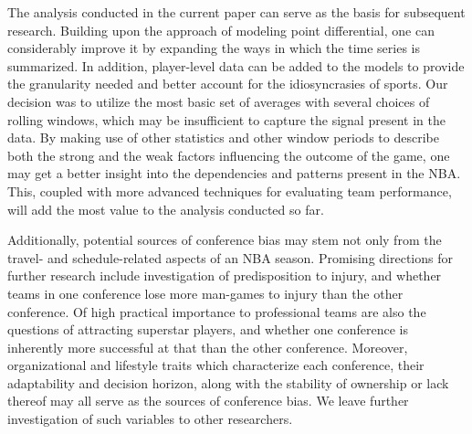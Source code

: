 \documentclass[
    12pt,
    a4paper,
    titlepage,  %
    abstract,  %
    headings=standardclasses,  %
    bibliography=totocnumbered  %
]{scrartcl}
\begin{document}
The analysis conducted in the current paper can serve as the basis for subsequent research. Building upon the approach of modeling point differential, one can considerably improve it by expanding the ways in which the time series is summarized. In addition, player-level data can be added to the models to provide the granularity needed and better account for the idiosyncrasies of sports. Our decision was to utilize the most basic set of averages with several choices of rolling windows, which may be insufficient to capture the signal present in the data. By making use of other statistics and other window periods to describe both the strong and the weak factors influencing the outcome of the game, one may get a better insight into the dependencies and patterns present in the NBA. This, coupled with more advanced techniques for evaluating team performance, will add the most value to the analysis conducted so far.  

Additionally, potential sources of conference bias may stem not only from the travel- and schedule-related aspects of an NBA season. Promising directions for further research include investigation of predisposition to injury, and whether teams in one conference lose more man-games to injury than the other conference. Of high practical importance to professional teams are also the questions of attracting superstar players, and whether one conference is inherently more successful at that than the other conference. Moreover, organizational and lifestyle traits which characterize each conference, their adaptability and decision horizon, along with the stability of ownership or lack thereof may all serve as the sources of conference bias. We leave further investigation of such variables to other researchers.
\end{document}
